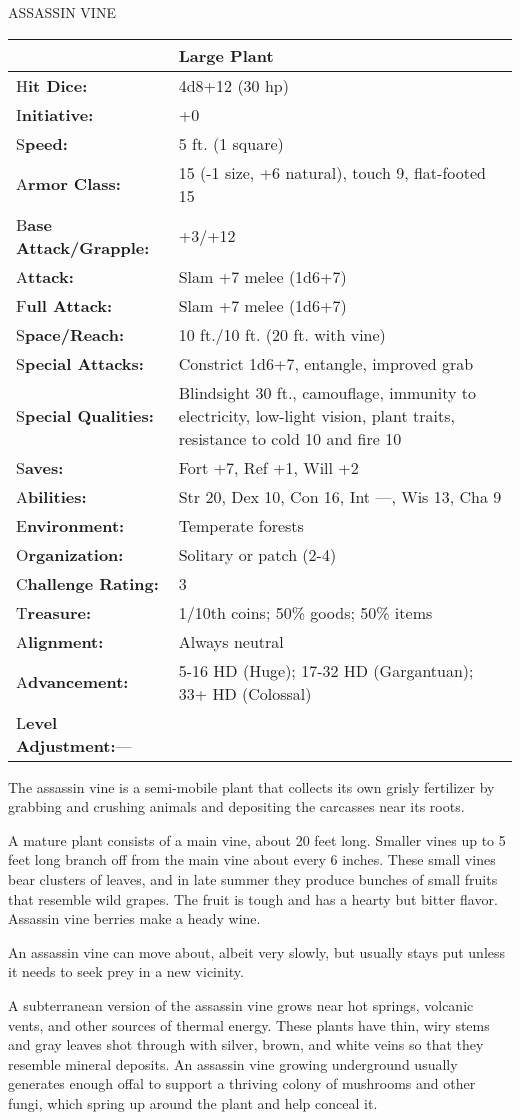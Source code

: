 \documentclass{article}
\begin{document}
\vspace{12pt}
{\LARGE{}ASSASSIN VINE}

\begin{tabular}{|>{\raggedright}p{91pt}|>{\raggedright}p{187pt}|}
\hline
  & Large Plant\tabularnewline
\hline
H\textbf{it Dice:} & 4d8+12 (30 hp)\tabularnewline
\hline
I\textbf{nitiative:} & +0\tabularnewline
\hline
S\textbf{peed:} & 5 ft. (1 square)\tabularnewline
\hline
A\textbf{rmor Class:} & 15 (-1 size, +6 natural), touch 9, flat-footed 15\tabularnewline
\hline
B\textbf{ase Attack/Grapple:} & +3/+12\tabularnewline
\hline
A\textbf{ttack:} & Slam +7 melee (1d6+7)\tabularnewline
\hline
F\textbf{ull Attack:} & Slam +7 melee (1d6+7)\tabularnewline
\hline
S\textbf{pace/Reach:} & 10 ft./10 ft. (20 ft. with vine)\tabularnewline
\hline
S\textbf{pecial Attacks:} & Constrict 1d6+7, entangle, improved grab\tabularnewline
\hline
S\textbf{pecial Qualities:} & Blindsight 30 ft., camouflage, immunity to electricity, 
low-light vision, plant traits, resistance to cold 10 and fire 10\tabularnewline
\hline
S\textbf{aves:} & Fort +7, Ref +1, Will +2\tabularnewline
\hline
A\textbf{bilities:} & Str 20, Dex 10, Con 16, Int ---, Wis 13, Cha 9\tabularnewline
\hline
E\textbf{nvironment:} & Temperate forests\tabularnewline
\hline
O\textbf{rganization:} & Solitary or patch (2-4)\tabularnewline
\hline
C\textbf{hallenge Rating:} & 3\tabularnewline
\hline
T\textbf{reasure:} & 1/10th coins; 50\% goods; 50\% items\tabularnewline
\hline
A\textbf{lignment:} & Always neutral\tabularnewline
\hline
A\textbf{dvancement:} & 5-16 HD (Huge); 17-32 HD (Gargantuan); 33+ HD (Colossal)\tabularnewline
\hline
L\textbf{evel Adjustment:}--- & \tabularnewline
\hline
\end{tabular}

The assassin vine is a semi-mobile plant that collects its own grisly fertilizer 
by grabbing and crushing animals and depositing the carcasses near its roots.

A mature plant consists of a main vine, about 20 feet long. Smaller vines up to 
5 feet long branch off from the main vine about every 6 inches. These small vines 
bear clusters of leaves, and in late summer they produce bunches of small fruits 
that resemble wild grapes. The fruit is tough and has a hearty but bitter flavor. 
Assassin vine berries make a heady wine.

An assassin vine can move about, albeit very slowly, but usually stays put unless 
it needs to seek prey in a new vicinity.

A subterranean version of the assassin vine grows near hot springs, volcanic vents, 
and other sources of thermal energy. These plants have thin, wiry stems and gray 
leaves shot through with silver, brown, and white veins so that they resemble mineral 
deposits. An assassin vine growing underground usually generates enough offal to 
support a thriving colony of mushrooms and other fungi, which spring up around 
the plant and help conceal it.
\end{document}
